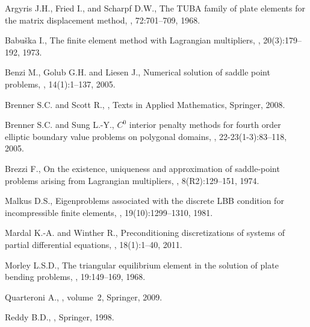 \documentclass{marine_2015}
\begin{document}
%
\newpage
\begin{thebibliography}{16}

Argyris J.H., Fried I., and Scharpf D.W.,
\newblock
The TUBA family of plate elements for the matrix displacement method,
, 72:701--709, 1968.

Babu\v{s}ka I.,
\newblock The finite element method with Lagrangian multipliers,
, 20(3):179--192, 1973.

Benzi M., Golub G.H. and Liesen J.,
\newblock Numerical solution of saddle point problems,
, 14(1):1--137, 2005.

Brenner S.C. and Scott R.,
,
\newblock Texts in Applied Mathematics, Springer, 2008.

Brenner S.C. and Sung L.-Y.,
\newblock $C^0$ interior penalty methods for fourth order elliptic boundary value
  problems on polygonal domains,
, 22-23(1-3):83--118, 2005.

Brezzi F.,
\newblock On the existence, uniqueness and approximation of saddle-point
  problems arising from Lagrangian multipliers,
, 8(R2):129--151, 1974.

Malkus D.S.,
\newblock Eigenproblems associated with the discrete LBB condition for
  incompressible finite elements,
,
  19(10):1299--1310, 1981.

Mardal K.-A. and Winther R.,
\newblock Preconditioning discretizations of systems of partial differential
  equations,
, 18(1):1--40, 2011.

Morley L.S.D.,
\newblock The triangular equilibrium element in the solution of plate bending
  problems,
, 19:149--169, 1968.

Quarteroni A.,
, volume~2,
\newblock Springer, 2009.

Reddy B.D.,
,
\newblock Springer, 1998.


\end{thebibliography}
\end{document}
